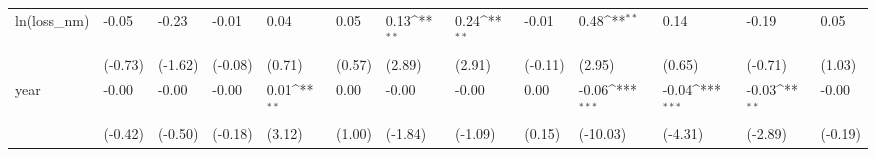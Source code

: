 \def\sym#1{\ifmmode^{#1}\else\(^{#1}\)\fi}
\begin{tabular}{p{1.5cm} p{1.7cm} p{1.7cm} p{1.7cm}  p{1.7cm} p{1.7cm} p{1.7cm} p{1.7cm} p{1.7cm}  p{1.7cm} p{1.7cm} p{1.7cm} p{1.7cm} }
\hline
ln(loss\_nm)     &    -0.05         &    -0.23         &    -0.01         &     0.04         &     0.05         &     0.13\sym{**} &     0.24\sym{**} &    -0.01         &     0.48\sym{**} &     0.14         &    -0.19         &     0.05         \\
                &  (-0.73)         &  (-1.62)         &  (-0.08)         &   (0.71)         &   (0.57)         &   (2.89)         &   (2.91)         &  (-0.11)         &   (2.95)         &   (0.65)         &  (-0.71)         &   (1.03)         \\
year            &    -0.00         &    -0.00         &    -0.00         &     0.01\sym{**} &     0.00         &    -0.00         &    -0.00         &     0.00         &    -0.06\sym{***}&    -0.04\sym{***}&    -0.03\sym{**} &    -0.00         \\
                &  (-0.42)         &  (-0.50)         &  (-0.18)         &   (3.12)         &   (1.00)         &  (-1.84)         &  (-1.09)         &   (0.15)         & (-10.03)         &  (-4.31)         &  (-2.89)         &  (-0.19)         \\
\end{tabular}
